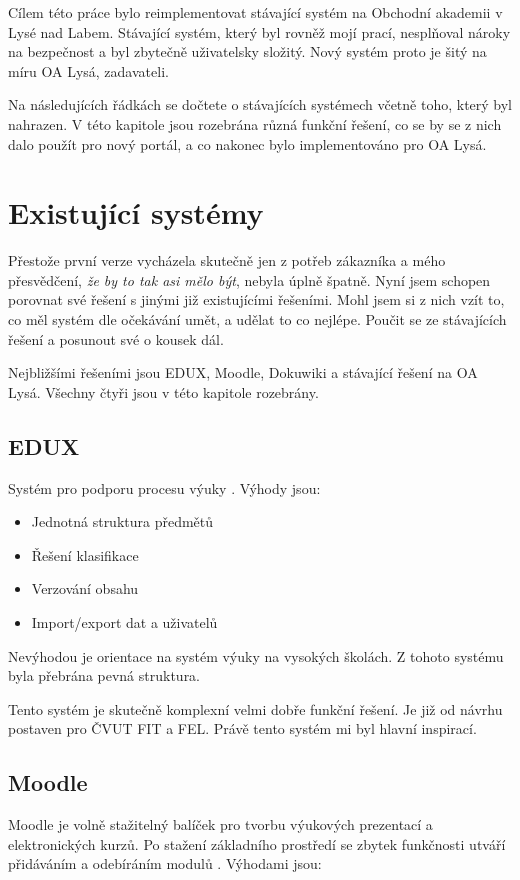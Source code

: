 \documentclass[thesis=B,czech]{FITthesis}[2012/06/26]
\begin{document}
Cílem této práce bylo reimplementovat stávající systém na Obchodní akademii v Lysé nad Labem. Stávající systém, který byl rovněž mojí prací, nesplňoval nároky na bezpečnost a byl zbytečně uživatelsky složitý. Nový systém proto je šitý na míru OA Lysá, zadavateli.

Na následujících řádkách se dočtete o stávajících systémech včetně toho, který byl nahrazen. V této kapitole jsou rozebrána různá funkční řešení, co se by se z nich dalo použít pro nový portál, a co nakonec bylo implementováno pro OA Lysá.

\section{Existující systémy}

Přestože první verze vycházela skutečně jen z potřeb zákazníka a mého přesvědčení, \textit{že by to tak asi mělo být}, nebyla úplně špatně. Nyní jsem schopen porovnat své řešení s jinými již existujícími řešeními. Mohl jsem si z nich vzít to, co měl systém dle očekávání umět, a udělat to co nejlépe. Poučit se ze stávajících řešení a posunout své o kousek dál.

Nejbližšími řešeními jsou EDUX, Moodle, Dokuwiki a stávající řešení na OA Lysá. Všechny čtyři jsou v této kapitole rozebrány.

\subsection{EDUX}
Systém pro podporu procesu výuky \cite{edux}. Výhody jsou:

\begin{itemize}
	\item Jednotná struktura předmětů
	\item	Řešení klasifikace
	\item Verzování obsahu
	\item Import/export dat a uživatelů
\end{itemize}

Nevýhodou je orientace na systém výuky na vysokých školách. Z tohoto systému byla přebrána pevná struktura.

Tento systém je skutečně komplexní velmi dobře funkční řešení. Je již od návrhu postaven pro ČVUT FIT a FEL. Právě tento systém mi byl hlavní inspirací.

\subsection{Moodle}
Moodle je volně stažitelný balíček pro tvorbu výukových prezentací a elektronických kurzů. Po stažení základního prostředí se zbytek funkčnosti utváří přidáváním a odebíráním modulů \cite{moodle}. Výhodami jsou:
\end{document}
